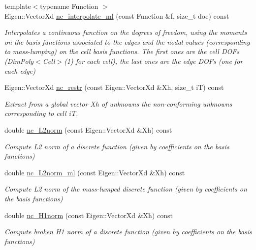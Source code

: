 \begin{DoxyCompactItemize}
{\footnotesize template$<$typename Function $>$ }\\Eigen\+::\+Vector\+Xd \hyperlink{group__BPNC_ga28d174f3526b19d85e225b9db5f9de8e}{nc\+\_\+interpolate\+\_\+ml} (const Function \&f, size\+\_\+t doe) const
\begin{DoxyCompactList}\small\item\em Interpolates a continuous function on the degrees of freedom, using the moments on the basis functions associated to the edges and the nodal values (corresponding to mass-\/lumping) on the cell basis functions. The first ones are the cell D\+O\+Fs (Dim\+Poly$<$\+Cell$>$(1) for each cell), the last ones are the edge D\+O\+Fs (one for each edge) \end{DoxyCompactList}\item 
Eigen\+::\+Vector\+Xd \hyperlink{group__BPNC_gad91a640f713f2f584b9280d7740f97da}{nc\+\_\+restr} (const Eigen\+::\+Vector\+Xd \&Xh, size\+\_\+t iT) const
\begin{DoxyCompactList}\small\item\em Extract from a global vector Xh of unknowns the non-\/conforming unknowns corresponding to cell iT. \end{DoxyCompactList}\item 
double \hyperlink{group__BPNC_gafd34682af893a9c13dc8f60b9f2ca532}{nc\+\_\+\+L2norm} (const Eigen\+::\+Vector\+Xd \&Xh) const
\begin{DoxyCompactList}\small\item\em Compute L2 norm of a discrete function (given by coefficients on the basis functions) \end{DoxyCompactList}\item 
double \hyperlink{group__BPNC_gabca2e8cbf4f01cddfa96124a07526a0e}{nc\+\_\+\+L2norm\+\_\+ml} (const Eigen\+::\+Vector\+Xd \&Xh) const
\begin{DoxyCompactList}\small\item\em Compute L2 norm of the mass-\/lumped discrete function (given by coefficients on the basis functions) \end{DoxyCompactList}\item 
double \hyperlink{group__BPNC_ga3d9e24f90636c4a8a5cac49f03e7ff59}{nc\+\_\+\+H1norm} (const Eigen\+::\+Vector\+Xd \&Xh) const
\begin{DoxyCompactList}\small\item\em Compute broken H1 norm of a discrete function (given by coefficients on the basis functions) \end{DoxyCompactList}\item 

\end{DoxyCompactItemize}
